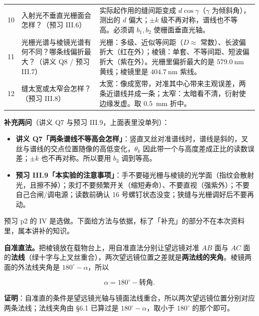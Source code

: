 \documentclass[11pt]{ctexart}
\begin{document}
\begin{center}
\begin{tabular}{@{}p{0.6cm}p{5.4cm}p{9.8cm}@{}}
10 & 入射光不垂直光栅面会怎样？（预习 III.6） & 实际起作用的缝间距变成 $d\cos\gamma$（$\gamma$ 为倾斜角），测出的 $d$ 偏大；$\pm k$ 级不再对称，谱线也不等高。必须调 $b_1,b_2$ 使栅面垂直光轴。 \\
11 & 光栅光谱与棱镜光谱有何不同？哪条线偏折最大？（讲义 Q8 / 预习 III.7） & 光栅：多级、近似等间距（$D\approx$ 常数）、长波偏折大（红在外）；棱镜：单套、不等间距、短波偏折大（紫在外）。光栅里偏折最大的是 $579.0\ \mathrm{nm}$ 黄线；棱镜里是 $404.7\ \mathrm{nm}$ 紫线。 \\
12 & 缝太宽或太窄会怎样？（预习 III.8） & 太宽：像成宽带，对准其中心带来主观误差，两条近谱线并成一条；太窄：太暗看不清，衍射使边缘发虚。取 $0.5$~mm 折中。 \\
\bottomrule
\end{tabular}
\end{center}

\textbf{补充两问}（讲义 Q7 与预习 III.9，上面表里没单列）：

\begin{itemize}
\item \textbf{讲义 Q7「两条谱线不等高会怎样」}：竖直叉丝对准谱线时，谱线是斜的，叉丝与谱线的交点位置随像的高低变化，$\theta_k$ 因此带一个与高度差成正比的读数误差；$\pm k$ 也不再对称。所以要用 $b_3$ 调到等高。
\item \textbf{预习 III.9「本实验的注意事项」}：手不要碰光栅与棱镜的光学面（指纹会散射光，且擦不掉）；汞灯不要频繁开关（缩短寿命）、不要直视（强紫外）；不要自己合闸/调电源；读数前确认 16 号螺钉状态没变；狭缝与光栅调好后不要再动。
\end{itemize}




预习 p2 的 IV 是选做。下面给方法与依据，标了「补充」的部分不在本次资料里，属本讲补的知识。


\textbf{自准直法。}把棱镜放在载物台上，用自准直法分别让望远镜对准 $AB$ 面与 $AC$ 面的\textbf{法线}（绿十字与上叉丝重合），两次望远镜位置之差就是\textbf{两法线的夹角}。棱镜两面的外法线夹角是 $180^{\circ}-\alpha$，所以

\[
\alpha=180^{\circ}-\text{转角}.
\]

\textbf{证明}：自准直的条件是望远镜光轴与镜面法线重合，所以两次望远镜位置分别对应两条法线；法线夹角由 §6.1 已算过是 $180^{\circ}-\alpha$，取小于 $180^{\circ}$ 的那个即可。
\end{document}
